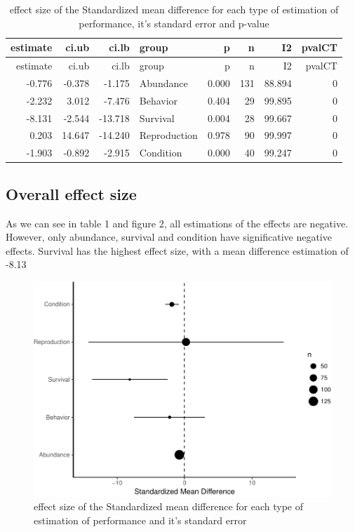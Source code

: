 \documentclass[]{elsarticle} %
\makeatletter
\def\maxwidth{\ifdim\Gin@nat@width>\linewidth\linewidth
\else\Gin@nat@width\fi}
\let\Oldincludegraphics\includegraphics
\renewcommand{\includegraphics}[1]{\Oldincludegraphics[width=\maxwidth]{#1}}
\makeatother
\begin{document}
\begin{longtable}[c]{@{}rrrlrrrr@{}}
\caption{effect size of the Standardized mean difference for each type
of estimation of performance, it's standard error and
p-value}\tabularnewline
\toprule
estimate & ci.ub & ci.lb & group & p & n & I2 & pvalCT\tabularnewline
\midrule
\endfirsthead
\toprule
estimate & ci.ub & ci.lb & group & p & n & I2 & pvalCT\tabularnewline
\midrule
\endhead
-0.776 & -0.378 & -1.175 & Abundance & 0.000 & 131 & 88.894 &
0\tabularnewline
-2.232 & 3.012 & -7.476 & Behavior & 0.404 & 29 & 99.895 &
0\tabularnewline
-8.131 & -2.544 & -13.718 & Survival & 0.004 & 28 & 99.667 &
0\tabularnewline
0.203 & 14.647 & -14.240 & Reproduction & 0.978 & 90 & 99.997 &
0\tabularnewline
-1.903 & -0.892 & -2.915 & Condition & 0.000 & 40 & 99.247 &
0\tabularnewline
\bottomrule
\end{longtable}

\subsection{Overall effect size}\label{overall-effect-size}

As we can see in table 1 and figure 2, all estimations of the effects
are negative. However, only abundance, survival and condition have
significative negative effects. Survival has the highest effect size,
with a mean difference estimation of -8.13

\begin{figure}[htbp]
\centering
\includegraphics{MetanalysisNeonics_files/figure-latex/unnamed-chunk-4-1.pdf}
\caption{effect size of the Standardized mean difference for each type
of estimation of performance and it's standard error}
\end{figure}
\end{document}
